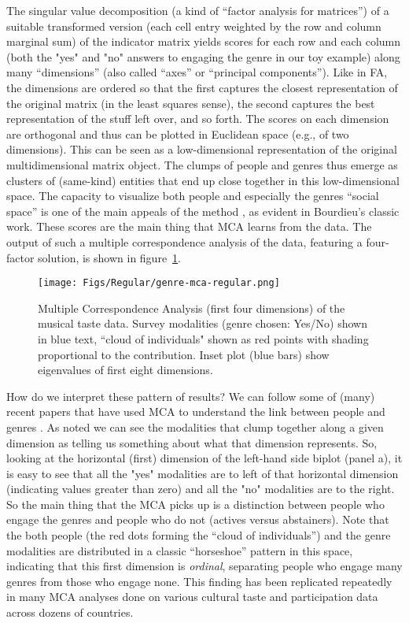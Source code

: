  The singular value decomposition (a kind of ``factor analysis for matrices'') of a suitable transformed version (each cell entry weighted by the row and column marginal sum) of the indicator matrix yields scores for each row and each column (both the "yes" and "no" answers to engaging the genre in our toy example) along many ``dimensions'' (also called ``axes'' or ``principal components''). Like in FA, the dimensions are ordered so that the first captures the closest representation of the original matrix (in the least squares sense), the second captures the best representation of the stuff left over, and so forth. The scores on each dimension are orthogonal and thus can be plotted in Euclidean space (e.g., of two dimensions). This can be seen as a low-dimensional representation of the original multidimensional matrix object. The clumps of people and genres thus emerge as clusters of (same-kind) entities that end up close together in this low-dimensional space. The capacity to visualize both people and especially the genres ``social space'' is one of the main appeals of the method \citep{greenacre_blasius06}, as evident in Bourdieu's \citeyearpar{bourdieu84} classic work. These scores are the main thing that MCA learns from the data. The output of such a multiple correspondence analysis of the data, featuring a four-factor solution, is shown in figure~\ref{fig:mca}. 
 
 \begin{figure}[ht!]
 \centering
 \texttt{[image: Figs/Regular/genre-mca-regular.png]}
    \caption{Multiple Correspondence Analysis (first four dimensions) of the musical taste data. Survey modalities (genre chosen: Yes/No) shown in blue text, ``cloud of individuals" shown as red points with shading proportional to the contribution. Inset plot (blue bars) show eigenvalues of first eight dimensions.}
    \label{fig:mca}
 \end{figure}
 
 How do we interpret these pattern of results? We can follow some of (many) recent papers that have used MCA to understand the link between people and genres \citep[e.g.,][]{roose_etal12}. As noted we can see the modalities that clump together along a given dimension as telling us something about what that dimension represents. So, looking at the horizontal (first) dimension of the left-hand side biplot (panel a), it is easy to see that all the "yes" modalities are to left of that horizontal dimension (indicating values greater than zero) and all the "no" modalities are to the right. So the main thing that the MCA picks up is a distinction between people who engage the genres and people who do not (actives versus abstainers). Note that the both people (the red dots forming the ``cloud of individuals'') and the genre modalities are distributed in a classic ``horseshoe'' pattern in this space, indicating that this first dimension is {\em ordinal}, separating people who engage many genres from those who engage none. This finding has been replicated repeatedly in many MCA analyses done on various cultural taste and participation data across dozens of countries.
 

